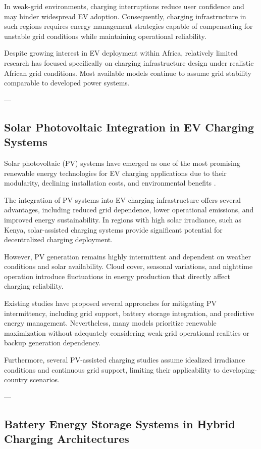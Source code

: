 In weak-grid environments, charging interruptions reduce user confidence and may hinder widespread EV adoption. Consequently, charging infrastructure in such regions requires energy management strategies capable of compensating for unstable grid conditions while maintaining operational reliability.

Despite growing interest in EV deployment within Africa, relatively limited research has focused specifically on charging infrastructure design under realistic African grid conditions. Most available models continue to assume grid stability comparable to developed power systems.

---

\subsection{Solar Photovoltaic Integration in EV Charging Systems}

Solar photovoltaic (PV) systems have emerged as one of the most promising renewable energy technologies for EV charging applications due to their modularity, declining installation costs, and environmental benefits \cite{pv_ev_charging_review}.

The integration of PV systems into EV charging infrastructure offers several advantages, including reduced grid dependence, lower operational emissions, and improved energy sustainability. In regions with high solar irradiance, such as Kenya, solar-assisted charging systems provide significant potential for decentralized charging deployment.

However, PV generation remains highly intermittent and dependent on weather conditions and solar availability. Cloud cover, seasonal variations, and nighttime operation introduce fluctuations in energy production that directly affect charging reliability.

Existing studies have proposed several approaches for mitigating PV intermittency, including grid support, battery storage integration, and predictive energy management. Nevertheless, many models prioritize renewable maximization without adequately considering weak-grid operational realities or backup generation dependency.

Furthermore, several PV-assisted charging studies assume idealized irradiance conditions and continuous grid support, limiting their applicability to developing-country scenarios.

---

\subsection{Battery Energy Storage Systems in Hybrid Charging Architectures}

